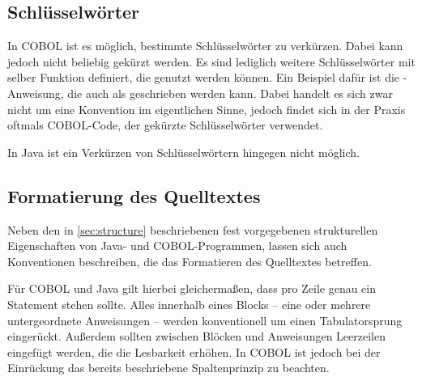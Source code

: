 \subsection{Schlüsselwörter}
In COBOL ist es möglich, bestimmte Schlüsselwörter zu verkürzen. Dabei kann jedoch nicht beliebig gekürzt werden. Es sind lediglich weitere Schlüsselwörter mit selber Funktion definiert, die genutzt werden können. Ein Beispiel dafür ist die -Anweisung, die auch als  geschrieben werden kann. Dabei handelt es sich zwar nicht um eine Konvention im eigentlichen Sinne, jedoch findet sich in der Praxis oftmals COBOL-Code, der gekürzte Schlüsselwörter verwendet.

In Java ist ein Verkürzen von Schlüsselwörtern hingegen nicht möglich.

\subsection{Formatierung des Quelltextes}

Neben den in \autoref{sec:structure} beschriebenen fest vorgegebenen strukturellen Eigenschaften von Java- und COBOL-Programmen, lassen sich auch Konventionen beschreiben, die das Formatieren des Quelltextes betreffen.

Für COBOL und Java gilt hierbei gleichermaßen, dass pro Zeile genau ein Statement stehen sollte. Alles innerhalb eines Blocks -- eine oder mehrere untergeordnete Anweisungen -- werden konventionell um einen Tabulatorsprung eingerückt. Außerdem sollten zwischen Blöcken und Anweisungen Leerzeilen eingefügt werden, die die Lesbarkeit erhöhen. In COBOL ist jedoch bei der Einrückung das bereits beschriebene Spaltenprinzip zu beachten.